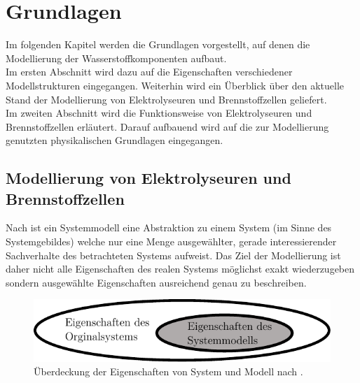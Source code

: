 \chapter{Grundlagen}
\label{cha:Grundlagen}
Im folgenden Kapitel werden die Grundlagen vorgestellt, auf denen die Modellierung der Wasserstoffkomponenten aufbaut.\\
Im ersten Abschnitt wird dazu auf die Eigenschaften verschiedener Modellstrukturen eingegangen. Weiterhin wird ein Überblick über den aktuelle Stand der Modellierung von Elektrolyseuren und Brennstoffzellen geliefert.\\
Im zweiten Abschnitt wird die Funktionsweise von Elektrolyseuren und Brennstoffzellen erläutert. Darauf aufbauend wird auf die zur Modellierung genutzten physikalischen Grundlagen eingegangen.\\ 

\section{Modellierung von Elektrolyseuren und Brennstoffzellen}
Nach \citet[S.~32]{tabeling_softwaresysteme_2006} ist ein Systemmodell eine Abstraktion zu einem System (im Sinne des Systemgebildes) welche nur eine Menge ausgewählter, gerade interessierender Sachverhalte des betrachteten Systems aufweist. Das Ziel der Modellierung ist daher nicht alle Eigenschaften des realen Systems möglichst exakt wiederzugeben sondern ausgewählte Eigenschaften ausreichend genau zu beschreiben.\\

\begin{figure}[h]
	\centering
		\includegraphics[scale=1]{Figures/Modell-System.pdf}
		\caption{Überdeckung der Eigenschaften von System und Modell nach \citet{tabeling_softwaresysteme_2006}.}
\label{fig:Modell-System}	
\end{figure}

